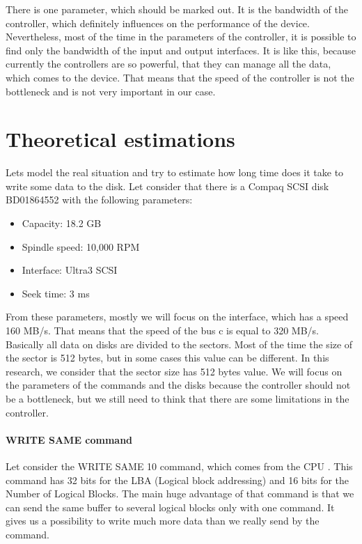There is one parameter, which should be marked out. It is the bandwidth of the controller, which definitely influences on the performance of the device. Nevertheless, most of the time in the parameters of the controller, it is possible to find only the bandwidth of the input and output interfaces. It is like this, because currently the controllers are so powerful, that they can manage all the data, which comes to the device. That means that the speed of the controller is not the bottleneck and is not very important in our case.

\section{Theoretical estimations}
\label{sec:theory_est}

Lets model the real situation and try to estimate how long time does it take to write some data to the disk. Let consider that there is a Compaq SCSI disk BD01864552 with the following parameters: 
\begin{itemize}
	\setlength{\itemsep}{-2mm}
	\item Capacity: 18.2 GB
	\item Spindle speed: 10,000 RPM
	\item Interface: Ultra3 SCSI
	\item Seek time: 3 ms
\end{itemize}
From these parameters, mostly we will focus on the interface, which has a speed 160 MB/s. That means that the speed of the bus c is equal to 320 MB/s. Basically all data on disks are divided to the sectors. Most of the time the size of the sector is 512 bytes, but in some cases this value can be different. In this research, we consider that the sector size has 512 bytes value. We will focus on the parameters of the commands and the disks because the controller should not be a bottleneck, but we still need to think that there are some limitations in the controller.

\paragraph{WRITE SAME command}
Let consider the WRITE SAME 10 command, which comes from the CPU \cite{scsi3_bc}. This command has 32 bits for the LBA (Logical block addressing) and 16 bits for the Number of Logical Blocks. The main huge advantage of that command is that we can send the same buffer to several logical blocks only with one command. It gives us a possibility to write much more data than we really send by the command.

